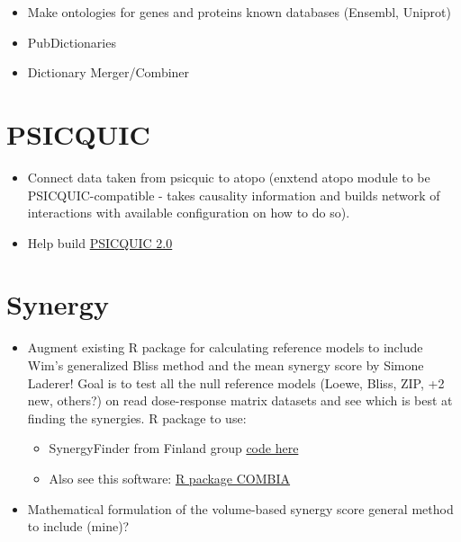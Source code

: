 \documentclass[12pt,]{book}
\providecommand{\tightlist}{%
  \setlength{\itemsep}{0pt}\setlength{\parskip}{0pt}}
\theoremstyle{definition}
\theoremstyle{definition}
\theoremstyle{definition}
\theoremstyle{remark}
\begin{document}
\begin{itemize}
\tightlist
\item
  Make ontologies for genes and proteins known databases (Ensembl, Uniprot)
\item
  PubDictionaries
\item
  Dictionary Merger/Combiner
\end{itemize}

\hypertarget{psicquic-1}{%
\section{PSICQUIC}\label{psicquic-1}}

\begin{itemize}
\tightlist
\item
  Connect data taken from psicquic to atopo (enxtend atopo module to be
  PSICQUIC-compatible - takes causality information and builds network of
  interactions with available configuration on how to do so).
\item
  Help build \href{https://github.com/elixir-europe/BioHackathon/tree/master/interoperability/Prototyping\%20the\%20new\%20PSICQUIC\%202-0}{PSICQUIC 2.0}
\end{itemize}

\hypertarget{synergy}{%
\section{Synergy}\label{synergy}}

\begin{itemize}
\tightlist
\item
  Augment existing R package for calculating reference models to include Wim's
  generalized Bliss method and the mean synergy score by Simone Laderer! Goal
  is to test all the null reference models (Loewe, Bliss, ZIP, +2 new, others?)
  on read dose-response matrix datasets and see which is best at finding the
  synergies. R package to use:

  \begin{itemize}
  \tightlist
  \item
    SynergyFinder from Finland group \href{https://github.com/google/synergyfinderengineered/}{code here}
  \item
    Also see this software: \href{https://www.ncbi.nlm.nih.gov/pmc/articles/PMC5732778/}{R package COMBIA}
  \end{itemize}
\item
  Mathematical formulation of the volume-based synergy score general method to
  include (mine)?
\end{itemize}
\end{document}
